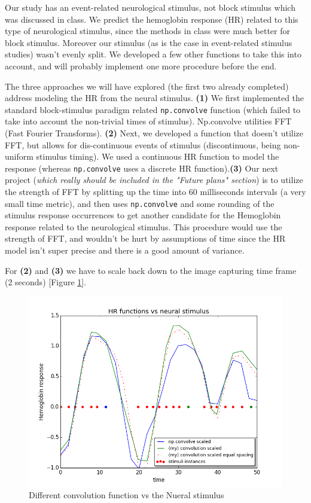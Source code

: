 \par  \indent Our study has an event-related neurological stimulus, not block stimulus which was discussed in class. We predict the hemoglobin response (HR) related to this type of neurological stimulus, since the methods in class were much better for block stimulus. Moreover our stimulus (as is the case in event-related stimulus studies) wasn't evenly split. We developed a few other functions to take this into account, and will probably implement one more procedure before the end.

\par  The three approaches we will have explored (the first two already completed) address modeling the HR from the neural stimulus. \textbf{(1)} We first implemented the standard block-stimulus paradigm related \texttt{np.convolve} function (which failed to take into account the non-trivial times of stimulus). Np.convolve utilities FFT (Fast Fourier Transforms). \textbf{(2)} Next, we developed a function that doesn't utilize FFT, but allows for dis-continuous events of stimulus (discontinuous, being non-uniform stimulus timing). We used a continuous HR function to model the response (whereas \texttt{np.convolve} uses a discrete HR function).\textbf{(3)} Our next project (\textit{which really should be included in the "Future plans" section}) is to utilize the strength of FFT by splitting up the time into 60 milliseconds intervals (a very small time metric), and then uses \texttt{np.convolve} and some rounding of the stimulus response occurrences to get another candidate for the Hemoglobin response related to the neurological stimulus. This procedure would use the strength of FFT, and wouldn't be hurt by assumptions of time since the HR model isn't super precise and there is a good amount of variance.
    
\par   For \textbf{(2)} and \textbf{(3)} we have to scale back down to the image capturing time frame (2 seconds) [Figure \ref{fig:convolution}].


\begin{figure}[ht]
\centering
\includegraphics[scale=0.5]{images/convolution_vs_neural_stimulus} 
\caption{Different convolution function vs the Nueral stimulus}
\label{fig:convolution}
\end{figure}

